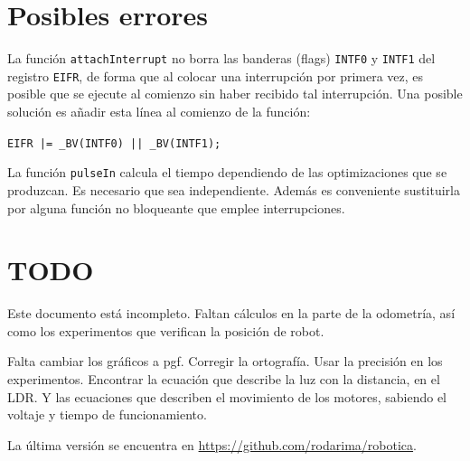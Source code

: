 \documentclass[10pt,a4paper,hidelinks,twocolumn]{article}
\begin{document}
\section{Posibles errores}

La función \texttt{attachInterrupt} no borra las banderas (flags) \texttt{INTF0} 
y \texttt{INTF1} del registro \texttt{EIFR}, de forma que al colocar una 
interrupción por primera vez, es posible que se ejecute al comienzo sin haber 
recibido tal interrupción. Una posible solución es añadir esta línea al comienzo 
de la función:

\texttt{EIFR |= \_BV(INTF0) || \_BV(INTF1);}

La función \texttt{pulseIn} calcula el tiempo dependiendo de las optimizaciones
que se produzcan. Es necesario que sea independiente. Además es conveniente
sustituirla por alguna función no bloqueante que emplee interrupciones.

\section{TODO}
Este documento está incompleto. Faltan cálculos en la parte de la odometría, así 
como los experimentos que verifican la posición de robot.

Falta cambiar los gráficos a pgf. Corregir la ortografía. Usar la precisión en 
los experimentos. Encontrar la ecuación que describe la luz con la distancia, en 
el LDR. Y las ecuaciones que describen el movimiento de los motores, sabiendo el 
voltaje y tiempo de funcionamiento.

La última versión se encuentra en \url{https://github.com/rodarima/robotica}.
\end{document}
